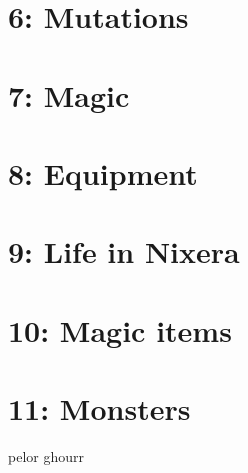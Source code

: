 \documentclass[a4paper]{article}
\begin{document}
\section{6: Mutations}

\section{7: Magic}

\section{8: Equipment}

\section{9: Life in Nixera}

\section{10: Magic items}

\section{11: Monsters}
pelor ghourr
\end{document}

